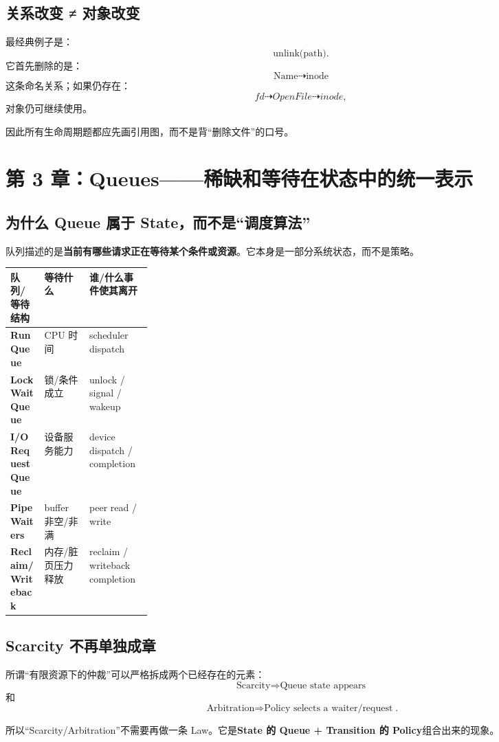\documentclass[11pt,a4paper]{ctexart}
\newcommand{\kw}[1]{\textbf{#1}}
\begin{document}
\subsection{关系改变 ≠ 对象改变}
最经典例子是：
\[
\text{unlink(path)}.
\]
它首先删除的是：
\[
\text{Name}\dashrightarrow\text{inode}
\]
这条命名关系；如果仍存在：
\[
fd\dashrightarrow OpenFile\dashrightarrow inode,
\]
对象仍可继续使用。

因此所有生命周期题都应先画引用图，而不是背“删除文件”的口号。

\section{第 3 章：Queues——稀缺和等待在状态中的统一表示}

\subsection{为什么 Queue 属于 State，而不是“调度算法”}
队列描述的是\kw{当前有哪些请求正在等待某个条件或资源}。它本身是一部分系统状态，而不是策略。

\begin{center}
\scriptsize
\renewcommand{\arraystretch}{1.25}
\begin{tabularx}{\linewidth}{>{\bfseries}p{0.24\linewidth} Y Y}
\toprule
队列/等待结构 & 等待什么 & 谁/什么事件使其离开 \\
\midrule
Run Queue & CPU 时间 & scheduler dispatch \\
Lock Wait Queue & 锁/条件成立 & unlock / signal / wakeup \\
I/O Request Queue & 设备服务能力 & device dispatch / completion \\
Pipe Waiters & buffer 非空/非满 & peer read / write \\
Reclaim/Writeback & 内存/脏页压力释放 & reclaim / writeback completion \\
\bottomrule
\end{tabularx}
\end{center}

\subsection{Scarcity 不再单独成章}
所谓“有限资源下的仲裁”可以严格拆成两个已经存在的元素：
\[
\boxed{\text{Scarcity}\Rightarrow\text{Queue state appears}}
\]
和
\[
\boxed{\text{Arbitration}\Rightarrow\text{Policy selects a waiter/request}}.
\]

所以“Scarcity/Arbitration”不需要再做一条 Law。它是\kw{State 的 Queue + Transition 的 Policy}组合出来的现象。
\end{document}
